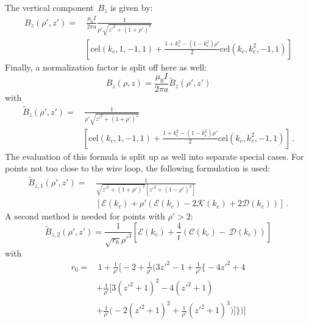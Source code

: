 The vertical component~$B_z$ is given by:
\begin{align}
 B_z(\rho', z')
 =&\, \frac{\mu_0 I}{2 \pi a}
   \frac{1}{\rho' \sqrt{z'^2 + (1 + \rho')^2}} \nonumber \\
 ~& \left[
       \textrm{cel}(k_c, 1, -1, 1)
     + \frac{1 + k_c^2 - \left( 1 - k_c^2 \right) \rho'}{2} \textrm{cel}(k_c, k_c^2, -1, 1)
   \right]
\end{align}
Finally, a normalization factor is split off here as well:
\begin{equation}
  B_z(\rho, z) = \frac{\mu_0 I}{2 \pi a} \tilde{B}_z(\rho', z')
\end{equation}
with
\begin{align}
  \tilde{B}_z(\rho', z')
  =&\, \frac{1}{\rho' \sqrt{z'^2 + (1 + \rho')^2}} \nonumber \\
 ~& \left[
       \textrm{cel}(k_c, 1, -1, 1)
     + \frac{1 + k_c^2 - \left( 1 - k_c^2 \right) \rho'}{2} \textrm{cel}(k_c, k_c^2, -1, 1)
   \right] \, .
\end{align}
The evaluation of this formula is split up as well into separate special cases.
For points not too close to the wire loop,
the following formulation is used:
\begin{align}
  \tilde{B}_{z,1} (\rho', z')
  =&\, \frac{1}{\sqrt{{z'}^2 + (1+\rho')^2} \left[{z'}^2 + (1 - \rho')^2 \right] } \nonumber \\
  ~&\,  \left[ \mathcal{E}(k_c) + \rho' \left( \mathcal{E}(k_c) - 2 \mathcal{K}(k_c) + 2 \mathcal{D}(k_c) \right) \right] \, .
\end{align}
A second method is needed for points with $\rho' > 2$:
\begin{equation}
  \tilde{B}_{z,2} (\rho', z')
  = \frac{1}{\sqrt{r_0} {\rho'}^3}
    \left[ \mathcal{E}(k_c) + \frac{4}{t} \left( \mathcal{C}(k_c) - \,\mathcal{D}(k_c) \right) \right]
\end{equation}
with
\begin{align}
  r_0
  = &\,             1 + \frac{1}{\rho'} \Biggl[
                  - 2 + \frac{1}{\rho'} \Biggl(
         3 {z'}^2 - 1 + \frac{1}{\rho'} \Biggl\{
       - 4 {z'}^2 + 4 \nonumber \\
  ~& + \frac{1}{\rho'} \Biggl[ 3 \left( {z'}^2 + 1 \right)^2 - 4 \left( {z'}^2 + 1 \right) \nonumber \\
  ~& + \frac{1}{\rho'} \Biggl(-2 \left( {z'}^2 + 1 \right)^2 + \frac{1}{\rho'} \left( {z'}^2 + 1 \right)^3
       \Biggr)
       \Biggr]
       \Biggr\}
       \Biggr)
       \Biggr]
\end{align}
